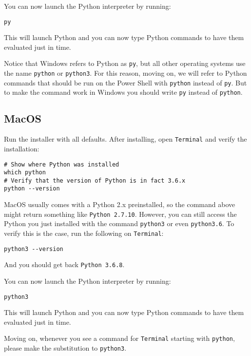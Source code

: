 \documentclass[12pt, a4paper]{article}
\begin{document}
You can now launch the Python interpreter by running:
\lstset{language=bash,label= ,caption= ,captionpos=b,firstnumber=1,numbers=left,style=powershell}
\begin{lstlisting}
py
\end{lstlisting}
This will launch Python and you can now type Python commands to have them evaluated just in time.

Notice that Windows refers to Python as \texttt{py}, but all other operating systems use the name \texttt{python} or \texttt{python3}.
For this reason, moving on, we will refer to Python commands that should be run on the Power Shell with \texttt{python} instead of \texttt{py}. But to make the command work in Windows you should write \texttt{py} instead of \texttt{python}.
\subsection*{MacOS}
\label{sec:org9eaabf4}
Run the installer with all defaults.
After installing, open \texttt{Terminal} and verify the installation:
\lstset{language=bash,label= ,caption= ,captionpos=b,firstnumber=1,numbers=left,style=bash}
\begin{lstlisting}
# Show where Python was installed
which python
# Verify that the version of Python is in fact 3.6.x
python --version
\end{lstlisting}
MacOS usually comes with a Python 2.x preinstalled, so the command above might return something like \texttt{Python 2.7.10}.
However, you can still access the Python you just installed with the command \texttt{python3} or even \texttt{python3.6}.
To verify this is the case, run the following on \texttt{Terminal}:
\lstset{language=bash,label= ,caption= ,captionpos=b,firstnumber=1,numbers=left,style=bash}
\begin{lstlisting}
python3 --version
\end{lstlisting}
And you should get back \texttt{Python 3.6.8}.

You can now launch the Python interpreter by running:
\lstset{language=bash,label= ,caption= ,captionpos=b,firstnumber=1,numbers=left,style=bash}
\begin{lstlisting}
python3
\end{lstlisting}
This will launch Python and you can now type Python commands to have them evaluated just in time.

Moving on, whenever you see a command for \texttt{Terminal} starting with \texttt{python}, please make the substitution to \texttt{python3}.
\end{document}
